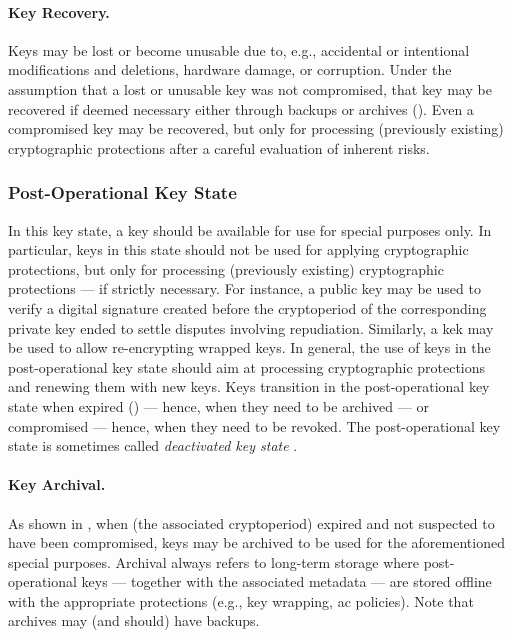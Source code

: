 
\paragraph*{Key Recovery.} Keys may be lost or become unusable due to, e.g., accidental or intentional modifications and deletions, hardware damage, or corruption. Under the assumption that a lost or unusable key was not compromised, that key may be recovered if deemed necessary either through backups or archives (). Even a compromised key may be recovered, but only for processing (previously existing) cryptographic protections after a careful evaluation of inherent risks. 


\subsubsection{Post-Operational Key State}\label{sec:key_management:lifecycle:post}

In this key state, a key should be available for use for special purposes only. In particular, keys in this state should not be used for applying cryptographic protections, but only for processing (previously existing) cryptographic protections --- if strictly necessary. For instance, a public key may be used to verify a digital signature created before the cryptoperiod of the corresponding private key ended to settle disputes involving repudiation. Similarly, a \gls{kek} may be used to allow re-encrypting wrapped keys. In general, the use of keys in the post-operational key state should aim at processing cryptographic protections and renewing them with new keys. Keys transition in the post-operational key state when expired () --- hence, when they need to be archived --- or compromised --- hence, when they need to be revoked. The post-operational key state is sometimes called \textit{deactivated key state} \cite{barker_recommendation_2020_p1}.

\paragraph*{Key Archival.} As shown in , when (the associated cryptoperiod) expired and not suspected to have been compromised, keys may be archived to be used for the aforementioned special purposes. Archival always refers to long-term storage where post-operational keys --- together with the associated metadata --- are stored offline with the appropriate protections (e.g., key wrapping, \gls{ac} policies). Note that archives may (and should) have backups.

